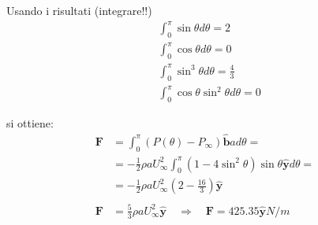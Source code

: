 \begin{itemize}
\vspace{0.2cm}
Usando i risultati (integrare!!)
\begin{equation}
\begin{aligned}
 & \int_{0}^{\pi} \sin{\theta} d\theta  = 2 \\
 & \int_{0}^{\pi} \cos{\theta} d\theta  = 0 \\
 & \int_{0}^{\pi} \sin^3{\theta} d\theta  = \frac{4}{3} \\
 & \int_{0}^{\pi} \cos{\theta}\sin^2{\theta} d\theta  = 0 
\end{aligned}
\end{equation}

si ottiene:
\begin{equation}
\begin{aligned}
  \bm{F} & = \int_{0}^{\pi} (P(\theta)-P_\infty) \hat{\bm{b}} a d\theta = \\
      & = - \frac{1}{2}\rho a U_\infty^2 \int_{0}^{\pi}  (1 - 4 \sin^2{\theta}) \sin{\theta}\hat{\bm{y}} d\theta = \\
      & = - \frac{1}{2}\rho a U_\infty^2 \displaystyle\left( 2 - \frac{16}{3}\right)\hat{\bm{y}} \\ \\
  \bm{F} & = \frac{5}{3}\rho a U_\infty^2 \hat{\bm{y}} \quad \Rightarrow \quad \bm{F} = 425.35 \hat{\bm{y}} N/m
\end{aligned}
\end{equation}


\end{itemize}

